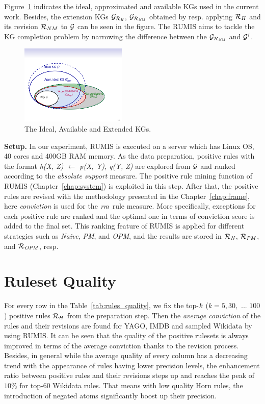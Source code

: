Figure~\ref{fig:venn} indicates the ideal, approximated and available KGs used in the current work. Besides, the extension KGs $\mathcal{G}_{\mathcal{R}_{\mathit{H}}}$, $\mathcal{G}_{\mathcal{R}_{\mathit{NM}}}$ obtained by resp. applying $\mathcal{R}_H$ and its revision $\mathcal{R}_{NM}$ to $\mathcal{G}$ can be seen in the figure. The RUMIS aims to tackle the KG completion problem by narrowing the difference between the $\mathcal{G}_{\mathcal{R}_{\mathit{NM}}}$ and $ \mathcal{G}^i$.

\begin{figure}[ht]
\centering
\includegraphics[width=0.45\textwidth]{figures/big_pic_exp}
\caption{The Ideal, Available and Extended KGs.}
\label{fig:venn}
\end{figure}

\textbf{Setup.} In our experiment, RUMIS is executed on a server which has Linux OS, 40 cores and 400GB RAM memory. As the data preparation, positive rules with the format \textit{h(X, Z) $\leftarrow$ p(X, Y), q(Y, Z)} are explored from $\mathcal{G}$ and ranked according to the \textit{absolute support} measure. The positive rule mining function of RUMIS (Chapter~\ref{chap:system}) is exploited in this step. After that, the positive rules are revised with the methodology presented in the Chapter~\ref{chap:frame}, here \textit{conviction} is used for the $\mathit{rm}$ rule measure. More specifically, exceptions for each positive rule are ranked and the optimal one in terms of conviction score is added to the final set. This ranking feature of RUMIS is applied for different strategies such as \emph{Naive}, \emph{PM}, and \emph{OPM}, and the results are stored in $\mathit{\mathcal{R}_{N}}$, $\mathit{\mathcal{R}_{PM}}$, and $\mathit{\mathcal{R}_{OPM}}$, resp.

\section{Ruleset Quality}

For every row in the Table~\ref{tab:rules_quality}, we fix the top-$\mathit{k}$ ($k=5,30,$ ... $100$) positive rules $\mathcal{R}_{H}$ from the preparation step. Then the \textit{average conviction} of the rules and their revisions are found for YAGO, IMDB and sampled Wikidata by using RUMIS. It can be seen that the quality of the positive rulesets is always improved in terms of the average conviction thanks to the revision process. Besides, in general while the average quality of every column has a decreasing trend with the appearance of rules having lower precision levels, the enhancement ratio between positive rules and their revisions steps up and reaches the peak of $10\%$ for top-60 Wikidata rules. That means with low quality Horn rules, the introduction of negated atoms significantly boost up their precision.

